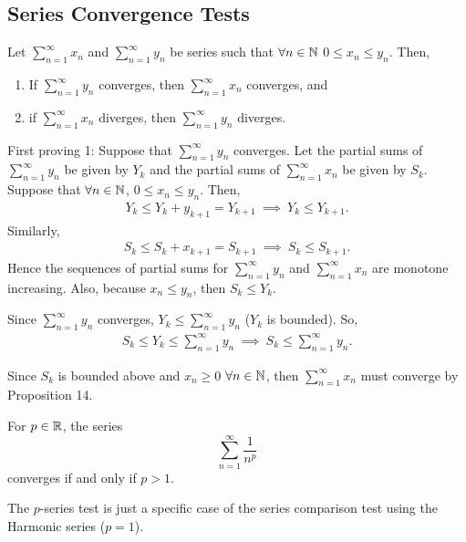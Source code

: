 \documentclass[12pt]{article}
\theoremstyle{definition}
\renewenvironment{proof}[1][\proofname]{\vspace{-10pt}\begin{replacementproof}}{\end{replacementproof}}
\newcommand{\xseries}{\sum_{n = 1}^{\infty}x_{n}}
\begin{document}
        \subsection{Series Convergence Tests}
            \begin{prop}
                Let $\xseries$ and $\sum_{n = 1}^{\infty}y_{n}$ be series such that $\forall n \in \mathbb{N}$ $0 \leq x_{n} \leq y_{n}$.
                Then,
                \begin{enumerate}
                    \item If $\sum_{n = 1}^{\infty}y_{n}$ converges, then $\xseries$ converges, and
                    \item if $\xseries$ diverges, then $\sum_{n = 1}^{\infty}y_{n}$ diverges.
                \end{enumerate}
            \end{prop}
            \begin{proof}
                First proving 1:
                Suppose that $\sum_{n = 1}^{\infty}y_{n}$ converges. Let the partial sums of $\sum_{n = 1}^{\infty}y_{n}$ be given by $Y_{k}$ and the partial sums of $\xseries$ be given by $S_{k}$. Suppose that $\forall n \in \mathbb{N}$, $0 \leq x_{n} \leq y_{n}$. Then,
                \begin{align*}
                    Y_{k} \leq Y_{k} + y_{k + 1} = Y_{k + 1} ~ \implies ~ Y_{k} \leq Y_{k + 1}.
                \end{align*}
                Similarly,
                \begin{align*}
                    S_{k} \leq S_{k} + x_{k + 1} = S_{k + 1} ~ \implies ~ S_{k} \leq S_{k + 1}.
                \end{align*}
                Hence the sequences of partial sums for $\sum_{n = 1}^{\infty}y_{n}$ and $\xseries$ are monotone increasing. Also, because $x_{n} \leq y_{n}$, then $S_{k} \leq Y_{k}$.

                Since $\sum_{n = 1}^{\infty}y_{n}$ converges, $Y_{k} \leq \sum_{n = 1}^{\infty}y_{n}$ ($Y_{k}$ is bounded). So,
                \begin{align*}
                    S_{k} \leq Y_{k} \leq \sum_{n = 1}^{\infty}y_{n} ~ \implies ~ S_{k} \leq \sum_{n = 1}^{\infty}y_{n}.
                \end{align*}

                Since $S_{k}$ is bounded above and $x_{n} \geq 0$ $\forall n \in \mathbb{N}$, then $\xseries$ must converge by Proposition 14.
            \end{proof}
            \begin{prop}
                For $p \in \R$, the series
                \begin{equation*}
                    \sum_{n = 1}^{\infty}\frac{1}{n^{p}}
                \end{equation*}
                converges if and only if $p > 1$.
            \end{prop}
            \begin{remark}
                The $p$-series test is just a specific case of the series comparison test using the Harmonic series ($p = 1$).
            \end{remark}
            
\end{document}
